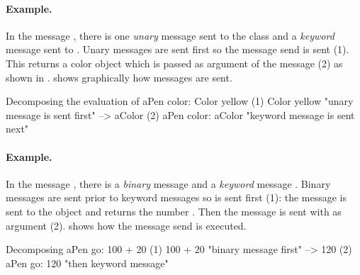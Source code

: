 \documentclass[a4paper,10pt,twoside]{book}
\begin{document}


\paragraph{Example.}
In the message , there is one \emph{unary} message  sent to the class  and a \emph{keyword} message  sent to . Unary messages are sent first so the message send  is sent (1). This returns a color object which is passed as argument of the message  (2) as shown in .
 shows graphically how messages are sent. 

\begin{example}[decColor]{Decomposing the evaluation of }{}
        aPen color: Color yellow
(1)                       Color yellow        "unary message is sent first"
                        --> aColor
(2)   aPen color: aColor                 "keyword message is sent next"
\end{example}

\paragraph{Example.} In the message , there is a \emph{binary} message  and a \emph{keyword} message . Binary messages are sent prior to keyword messages so  is sent first (1): the message  is sent to the object  and returns the number . Then the message  is sent with  as argument (2).
 shows how the message send is executed. 

\begin{example}[decGo]{Decomposing }{}
      aPen go: 100 + 20   
(1)                 100 + 20           "binary message first"
                   -->   120
(2)  aPen go: 120                   "then keyword message"
\end{example}
\end{document}
